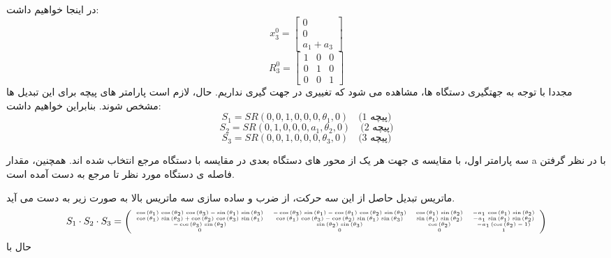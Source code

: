 در اینجا خواهیم داشت:
\[
x_3^0 = \begin{bmatrix}
	0 \\
	0 \\
	a_1 + a_3
\end{bmatrix}
\]
\[
R_3^0 = \begin{bmatrix}
	1 & 0 & 0 \\
	0 & 1 & 0 \\
	0 & 0 & 1
\end{bmatrix}
\]
 مجددا با توجه به جهتگیری دستگاه ها، مشاهده می شود که تغییری در جهت گیری نداریم. 
 حال، لازم است پارامتر های پیچه برای این تبدیل ها مشخص شوند.
 بنابراین خواهیم داشت:
\[
S_1 = SR(0, 0, 1, 0, 0, 0, \theta_1, 0) \quad \text{(پیچه 1)}
\]
\[
S_2 = SR(0, 1, 0, 0, 0, a_1, \theta_2, 0) \quad \text{(پیچه 2)}
\]
\[
S_3 = SR(0, 0, 1, 0, 0, 0, \theta_3, 0) \quad \text{(پیچه 3)}
\]

سه پارامتر اول، با مقایسه ی جهت هر یک از محور های دستگاه بعدی در مقایسه با دستگاه مرجع انتخاب شده اند.  همچنین، مقدار a با در نظر گرفتن فاصله ی دستگاه مورد نظر تا مرجع به دست آمده است.

ماتریس تبدیل حاصل از این سه حرکت، از ضرب و ساده سازی سه ماتریس بالا به صورت زیر به دست می آید.
\[
\tiny
S_1 \cdot S_2 \cdot S_3 =
\left(\begin{array}{cccc}
	\cos \left(\theta_1 \right)\,\cos \left(\theta_2 \right)\,\cos \left(\theta_3 \right)-\sin \left(\theta_1 \right)\,\sin \left(\theta_3 \right) & -\cos \left(\theta_3 \right)\,\sin \left(\theta_1 \right)-\cos \left(\theta_1 \right)\,\cos \left(\theta_2 \right)\,\sin \left(\theta_3 \right) & \cos \left(\theta_1 \right)\,\sin \left(\theta_2 \right) & -a_1 \,\cos \left(\theta_1 \right)\,\sin \left(\theta_2 \right) \\
	\cos \left(\theta_1 \right)\,\sin \left(\theta_3 \right)+\cos \left(\theta_2 \right)\,\cos \left(\theta_3 \right)\,\sin \left(\theta_1 \right) & \cos \left(\theta_1 \right)\,\cos \left(\theta_3 \right)-\cos \left(\theta_2 \right)\,\sin \left(\theta_1 \right)\,\sin \left(\theta_3 \right) & \sin \left(\theta_1 \right)\,\sin \left(\theta_2 \right) & -a_1 \,\sin \left(\theta_1 \right)\,\sin \left(\theta_2 \right) \\
	-\cos \left(\theta_3 \right)\,\sin \left(\theta_2 \right) & \sin \left(\theta_2 \right)\,\sin \left(\theta_3 \right) & \cos \left(\theta_2 \right) & -a_1 \,{\left(\cos \left(\theta_2 \right)-1\right)} \\
	0 & 0 & 0 & 1
\end{array}\right)
\]
 حال با 	


